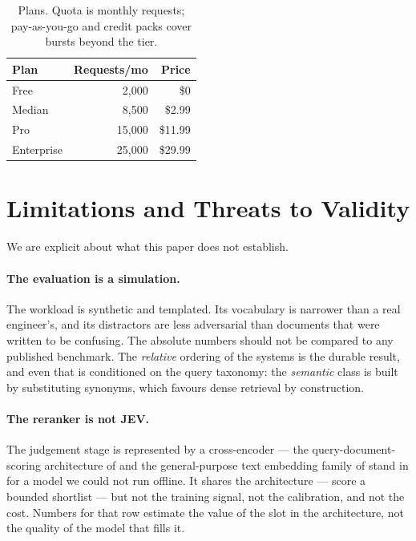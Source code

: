 \documentclass[10pt,twocolumn]{article}
\begin{document}
\begin{table}[t]
\caption{Plans. Quota is monthly requests; pay-as-you-go and credit packs cover
bursts beyond the tier.}
\label{tab:plans}
\centering\footnotesize
\begin{tabular}{@{}lrr@{}}
\toprule
Plan & Requests/mo & Price \\
\midrule
Free       & 2{,}000  & \$0 \\
Median     & 8{,}500  & \$2.99 \\
Pro        & 15{,}000 & \$11.99 \\
Enterprise & 25{,}000 & \$29.99 \\
\bottomrule
\end{tabular}
\end{table}

\section{Limitations and Threats to Validity}
\label{sec:limits}

We are explicit about what this paper does not establish.

\paragraph{The evaluation is a simulation.}
The workload is synthetic and templated. Its vocabulary is narrower than a real
engineer's, and its distractors are less adversarial than documents that were
written to be confusing. The absolute numbers should not be compared to any
published benchmark. The \emph{relative} ordering of the systems is the
durable result, and even that is conditioned on the query taxonomy: the
\emph{semantic} class is built by substituting synonyms, which favours dense
retrieval by construction.

\paragraph{The reranker is not JEV.}
The judgement stage is represented by a cross-encoder --- the
query-document-scoring architecture of \citet{devlin2019bert} and the
general-purpose text embedding family of \citet{wang2022gte} stand in for a
model we could not run offline. It shares the architecture --- score a bounded
shortlist --- but not the training signal, not the calibration, and not the
cost. Numbers for that row estimate the value of the slot in the architecture,
not the quality of the model that fills it.
\end{document}
